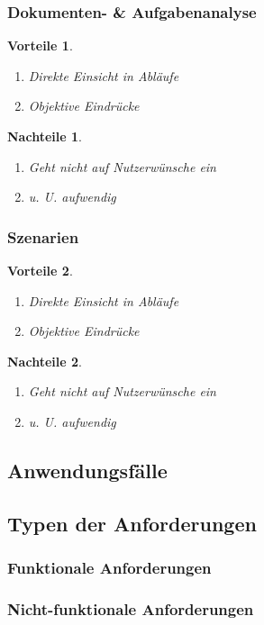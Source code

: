 \documentclass[a4paper]{article}
\theoremstyle{break}
\newtheorem{why}{Vorteile}[section]
\newtheorem{whynot}{Nachteile}[section]
\begin{document}
\subsubsection{Dokumenten- \& Aufgabenanalyse}
	\begin{why}
		\begin{enumerate}
			\item Direkte Einsicht in Abläufe
			\item Objektive Eindrücke
		\end{enumerate}
	\end{why}
	\begin{whynot}
		\begin{enumerate}
			\item Geht nicht auf Nutzerwünsche ein
			\item u. U. aufwendig
		\end{enumerate}
	\end{whynot}	
\subsubsection{Szenarien}
	\begin{why}
		\begin{enumerate}
			\item Direkte Einsicht in Abläufe
			\item Objektive Eindrücke
		\end{enumerate}
	\end{why}
	\begin{whynot}
		\begin{enumerate}
			\item Geht nicht auf Nutzerwünsche ein
			\item u. U. aufwendig
		\end{enumerate}
	\end{whynot}
\subsection{Anwendungsfälle}
\subsection{Typen der Anforderungen}
\subsubsection{Funktionale Anforderungen}
\subsubsection{Nicht-funktionale Anforderungen}
\end{document}
